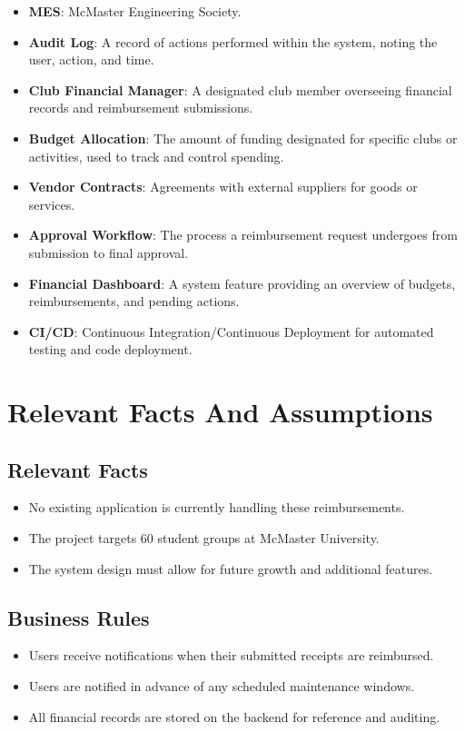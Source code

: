 \documentclass[12pt]{article}
\begin{document}
\begin{itemize}
    \item \textbf{MES}: McMaster Engineering Society.   
    \item \textbf{Audit Log}: A record of actions performed within the system, noting the user, action, and time.
    \item \textbf{Club Financial Manager}: A designated club member overseeing financial records and reimbursement submissions.
    \item \textbf{Budget Allocation}: The amount of funding designated for specific clubs or activities, used to track and control spending.
    \item \textbf{Vendor Contracts}: Agreements with external suppliers for goods or services.
    \item \textbf{Approval Workflow}: The process a reimbursement request undergoes from submission to final approval.
    \item \textbf{Financial Dashboard}: A system feature providing an overview of budgets, reimbursements, and pending actions.
    \item \textbf{CI/CD}: Continuous Integration/Continuous Deployment for automated testing and code deployment.
\end{itemize}

\section{Relevant Facts And Assumptions}
\subsection{Relevant Facts}
\begin{itemize}
  \item No existing application is currently handling these reimbursements.
  \item The project targets 60 student groups at McMaster University.
  \item The system design must allow for future growth and additional features.
\end{itemize}

\subsection{Business Rules}
\begin{itemize}
  \item Users receive notifications when their submitted receipts are reimbursed.
  \item Users are notified in advance of any scheduled maintenance windows.
  \item All financial records are stored on the backend for reference and auditing.
\end{itemize}
\end{document}
